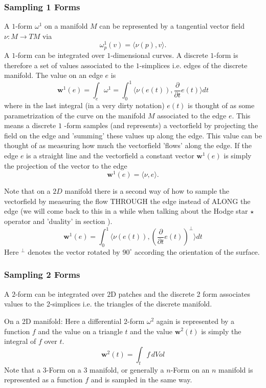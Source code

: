 \subsubsection{Sampling 1 Forms}
A $1$-form $\omega^1$ on a manifold $M$ can be represented by a tangential vector field $\nu:M\to TM$ via 
\[\omega^1_p(v) = \langle\nu(p),v\rangle.\] 
A $1$-form can be integrated over $1$-dimensional curves. A discrete $1$-form is therefore a set of values associated to the $1$-simplices i.e. edges of the discrete manifold. The value on an edge $e$ is
\[\textbf{w}^1(e) = \int_{e} \omega^1 = \int_{0}^1 \langle\nu(e(t)),\frac{\partial}{\partial t}e(t)\rangle dt\]
where in the last integral (in a very dirty notation) $e(t)$ is thought of as some parametrization of the curve on the manifold $M$ associated to the edge $e$. This means a discrete $1$ -form samples (and represents) a vectorfield by projecting the field on the edge and 'summing' these values up along the edge. This value can be thought of as measuring how much the vectorfield 'flows' along the edge. If the edge $e$ is a straight line and the vectorfield a constant vector  $\textbf{w}^1(e)$ is simply the projection of the vector to the edge
\[\textbf{w}^1(e) = \langle \nu, e \rangle.\]

Note that on a $2D$ manifold there is a second way of how to sample the vectorfield by measuring the flow THROUGH the edge instead of ALONG the edge (we will come back to this in a while when talking about the Hodge star $\star$ operator and 'duality' in section \note{[...]}). 
\[\textbf{w}^1(e) = \int_{0}^1 \langle\nu(e(t)),\left(\frac{\partial}{\partial t}e(t)\right)^\perp \rangle dt\]
Here $^\perp$ denotes the vector rotated by $90^\circ$ according the orientation of the surface.

\subsubsection{Sampling 2 Forms}
A $2$-form can be integrated over $2$D patches and the discrete 2 form associates values to the 2-simplices i.e. the triangles of the discrete manifold.

On a 2D manifold: Here a differential $2$-form $\omega^2$ again is represented by a function $f$ and the value on a triangle $t$ and the value $\textbf{w}^2(t)$ is simply the integral of $f$ over $t$.
\[\textbf{w}^2(t)= \int_{t} f\, dVol\]
Note that a $3$-Form on a 3 manifold, or generally a $n$-Form on an $n$ manifold is represented as a function $f$ and is sampled in the same way.

